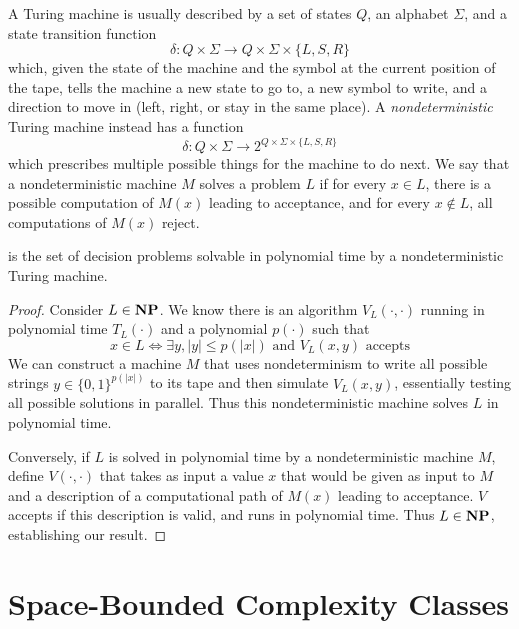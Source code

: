 A Turing machine is usually described by a set of states $Q$, an alphabet
$\Sigma$, and a state transition function
\begin{displaymath}
\delta : Q \times \Sigma \to Q \times \Sigma \times \{ L, S, R \}
\end{displaymath}
which, given the state of the machine and the symbol at the current
position of the tape, tells the machine a new state to go to, a new
symbol to write, and a direction to move in (left, right, or stay in
the same place).  A {\it nondeterministic} Turing machine instead has
a function
\begin{displaymath}
\delta : Q \times \Sigma \to 2^{Q \times \Sigma \times \{ L, S, R \}}
\end{displaymath}
which prescribes multiple possible things for the machine to do next.
We say that a nondeterministic machine $M$ solves a problem $L$ if
for every $x \in L$, there is a possible computation of $M(x)$ leading
to acceptance, and for every $x \notin L$, all computations of $M(x)$
reject.

\begin{Thm}
\np{} is the set of decision problems solvable in polynomial
time by a nondeterministic Turing machine.
\end{Thm}
\begin{proof}
Consider $L \in \np$.  We
know there is an algorithm $V_L(\cdot,\cdot)$ running in polynomial
time $T_L(\cdot)$ and a polynomial $p(\cdot)$ such that
\begin{displaymath}
x \in L \Leftrightarrow \exists y, |y| \le p(|x|) \mbox{ and } V_L(x,y) \mbox{ accepts}
\end{displaymath}
We can construct a machine $M$ that uses nondeterminism to write all
possible strings $y \in \{0,1\}^{p(|x|)}$ to its tape and then simulate
$V_L(x,y)$, essentially testing all possible solutions in parallel.
Thus this nondeterministic machine solves $L$ in polynomial time.

Conversely, if $L$ is solved in polynomial time by a nondeterministic
machine $M$, define $V(\cdot,\cdot)$ that takes as input a value $x$
that would be given as input to $M$ and a description of a computational
path of $M(x)$ leading to acceptance. $V$ accepts if this description
is valid, and runs in polynomial time.  Thus $L \in \np$, establishing
our result.
\end{proof}

\section{Space-Bounded Complexity Classes}

